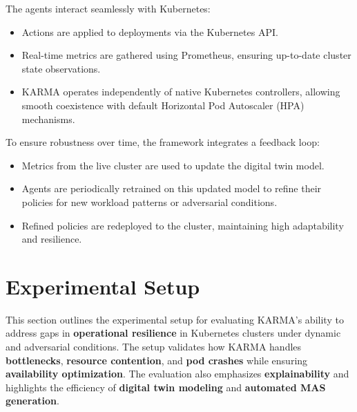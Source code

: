 \documentclass[conference]{IEEEtran}
\begin{document}
The agents interact seamlessly with Kubernetes:
\begin{itemize}
    \item Actions are applied to deployments via the Kubernetes API.
    \item Real-time metrics are gathered using Prometheus, ensuring up-to-date cluster state observations.
    \item KARMA operates independently of native Kubernetes controllers, allowing smooth coexistence with default Horizontal Pod Autoscaler (HPA) mechanisms.
\end{itemize}

To ensure robustness over time, the framework integrates a feedback loop:
\begin{itemize}
    \item Metrics from the live cluster are used to update the digital twin model.
    \item Agents are periodically retrained on this updated model to refine their policies for new workload patterns or adversarial conditions.
    \item Refined policies are redeployed to the cluster, maintaining high adaptability and resilience.
\end{itemize}



\section{Experimental Setup}
\label{sec:experiments}

This section outlines the experimental setup for evaluating KARMA's ability to address gaps in \textbf{operational resilience} in Kubernetes clusters under dynamic and adversarial conditions. The setup validates how KARMA handles \textbf{bottlenecks}, \textbf{resource contention}, and \textbf{pod crashes} while ensuring \textbf{availability optimization}. The evaluation also emphasizes \textbf{explainability} and highlights the efficiency of \textbf{digital twin modeling} and \textbf{automated MAS generation}.
\end{document}
